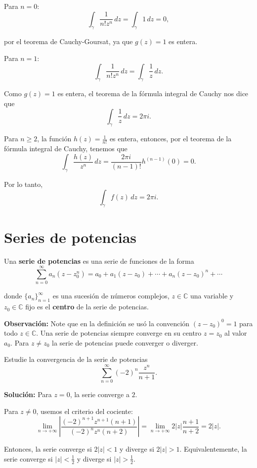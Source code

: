 \begin{ejemplo}[Certamen 2 (2020)]
\begin{itemize}
    Para $n = 0$:
    $$\int_{\gamma}  \frac{1}{n! z^n} \,dz = \int_{\gamma} 1 \,dz = 0,$$
    
    por el teorema de Cauchy-Goursat, ya que $g(z) = 1$ es entera.
    
    Para $n = 1$:
    $$\int_{\gamma} \frac{1}{n! z^n} \,dz = \int_{\gamma} \frac{1}{z} \,dz.$$
    
    Como $g(z) = 1$ es entera, el teorema de la fórmula integral de Cauchy nos dice que
    $$\int_{\gamma} \frac{1}{z} \,dz = 2\pi i.$$
    
    Para $n\geq 2$, la función $h(z) = \frac{1}{n!}$ es entera, entonces, por el teorema de la fórmula integral de Cauchy, tenemos que
    $$\int_{\gamma} \frac{h(z)}{z^n} \,dz = \frac{2\pi i}{(n-1)!} h^{(n-1)}(0) = 0.$$
    
    Por lo tanto,
    $$\int_{\gamma} f(z) \,dz = 2\pi i.$$
\end{itemize}
\end{ejemplo}

\section{Series de potencias}

\begin{defi}
Una \textbf{serie de potencias} es una serie de funciones de la forma
$$\sum_{n=0}^{\infty} a_n(z-z_0^n) = a_0 + a_1 (z-z_0) + \cdots + a_n (z-z_0)^n + \cdots$$

donde $\{a_n\}_{n=1}^{\infty}$ es una sucesión de números complejos, $z \in \mathbb{C}$ una variable y $z_0 \in \mathbb{C}$ fijo es el \textbf{centro} de la serie de potencias.
\end{defi}

\textbf{Observación:} Note que en la definición se usó la convención $(z-z_0)^{0} = 1$ para todo $z \in \mathbb{C}$. Una serie de potencias siempre converge en su centro $z = z_0$ al valor $a_0$. Para $z \neq z_0$ la serie de potencias puede converger o diverger.

\begin{ejemplo}
Estudie la convergencia de la serie de potencias
$$\sum_{n=0}^{\infty} (-2)^n \frac{z^n}{n+1}.$$

\textbf{Solución:} Para $z = 0$, la serie converge a $2$. 

Para $z \neq 0$, usemos el criterio del cociente:
$$\lim_{n\to + \infty} \left| \frac{(-2)^{n+1} z^{n+1}(n+1)}{(-2)^n z^n (n+2)}  \right| = \lim_{n\to + \infty} 2|z| \frac{n+1}{n+2} = 2|z|.$$

Entonces, la serie converge si $2|z| < 1$ y diverge si $2|z| >1 $. Equivalentemente, la serie converge si $|z| < \frac{1}{2}$ y diverge si $|z| > \frac{1}{2}$.
\end{ejemplo}

